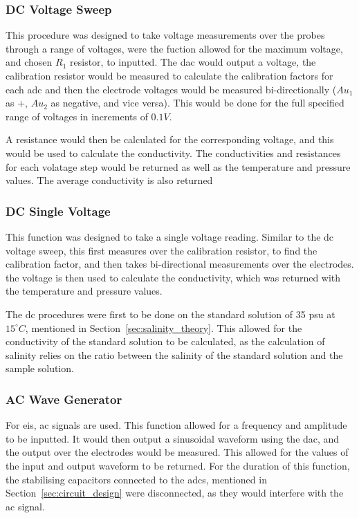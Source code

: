 \subsubsection{DC Voltage Sweep}
This procedure was designed to take voltage measurements over the probes through a range of voltages, were the fuction allowed for the maximum voltage, and chosen $R_1$ resistor, to inputted.
The \gls{dac} would output a voltage, the calibration resistor would be measured to calculate the calibration factors for each \gls{adc} and then the electrode voltages would be measured bi-directionally ($Au_1$ as +, $Au_2$ as negative, and vice versa).
This would be done for the full specified range of voltages in increments of $0.1V$.

A resistance would then be calculated for the corresponding voltage, and this would be used to calculate the conductivity.
The conductivities and resistances for each volatage step would be returned as well as the temperature and pressure values.
The average conductivity is also returned

\subsubsection{DC Single Voltage}
This function was designed to take a single voltage reading.
Similar to the \gls{dc} voltage sweep, this first measures over the calibration resistor, to find the calibration factor, and then takes bi-directional measurements over the electrodes.
the voltage is then used to calculate the conductivity, which was returned with the temperature and pressure values.

The \gls{dc} procedures were first to be done on the standard solution of 35 \gls{psu} at $15^{\circ}C$, mentioned in Section~\ref{sec:salinity_theory}.
This allowed for the conductivity of the standard solution to be calculated, as the calculation of salinity relies on the ratio between the salinity of the standard solution and the sample solution.

\subsubsection{AC Wave Generator}
For \gls{eis}, \gls{ac} signals are used. This function allowed for a frequency and amplitude to be inputted.
It would then output a sinusoidal waveform using the \gls{dac}, and the output over the electrodes would be measured.
This allowed for the values of the input and output waveform to be returned.
For the duration of this function, the stabilising capacitors connected to the \gls{adc}s, mentioned in Section~\ref{sec:circuit_design} were disconnected, as they would interfere with the \gls{ac} signal.

